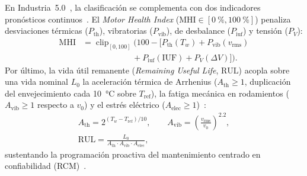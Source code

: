 En Industria~5.0~\cite{Breque2021}, la clasificación se complementa con dos indicadores pronósticos continuos~\cite{Gao2015,Thermal2025}. El \emph{Motor Health Index} ($\text{MHI} \in [\qty{0}{\percent}, \qty{100}{\percent}]$) penaliza desviaciones térmicas ($P_{\text{th}}$), vibratorias ($P_{\text{vib}}$), de desbalance ($P_{\text{iuf}}$) y tensión ($P_V$):
\begin{equation}
\begin{split}
\text{MHI} &= \operatorname{clip}_{[0,100]}\!\Big(100 - \big[P_{\text{th}}(T_w) + P_{\text{vib}}(v_{\text{rms}}) \\
&\qquad\qquad\qquad + P_{\text{iuf}}(\text{IUF}) + P_V(\Delta V)\big]\Big).
\end{split}
\label{eq:mhi}
\end{equation}
Por último, la vida útil remanente (\emph{Remaining Useful Life}, $\text{RUL}$) acopla sobre una vida nominal $L_0$ la aceleración térmica de Arrhenius ($A_{\text{th}} \ge 1$, duplicación del envejecimiento cada \qty{10}{\celsius} sobre $T_{\text{ref}}$), la fatiga mecánica en rodamientos ($A_{\text{vib}} \ge 1$ respecto a $v_0$) y el estrés eléctrico ($A_{\text{elec}} \ge 1$)~\cite{Gao2015,Thermal2025}:
\begin{equation}
\begin{gathered}
A_{\text{th}} = 2^{(T_w - T_{\text{ref}})/10}, \qquad
A_{\text{vib}} = \left(\frac{v_{\text{rms}}}{v_0}\right)^{\!2.2}, \\
\text{RUL} = \frac{L_0}{A_{\text{th}} \cdot A_{\text{vib}} \cdot A_{\text{elec}}},
\end{gathered}
\label{eq:rul}
\end{equation}
sustentando la programación proactiva del mantenimiento centrado en confiabilidad (RCM)~\cite{Moubray1997}.
